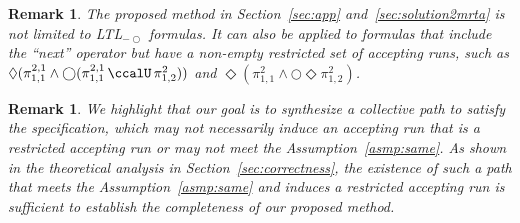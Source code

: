 \documentclass[Afour,sageh,times]{sagej}
\newtheorem{rem}[thm]{Remark}
\newcommand{\ltl}{ {\it LTL}$_{-\bigcirc}$ }
\renewcommand{\ap}[3]{\mathcal{\pi}_{{#1},{#2}}^{#3}}
\begin{document}
\begin{rem}
The proposed method in Section~\ref{sec:app} and~\ref{sec:solution2mrta} is not limited to  LTL$_{-\bigcirc}$ formulas. It can also be applied to  formulas that include the ``next'' operator but have a non-empty restricted set of accepting runs, such as $\Diamond(\ap{1}{1}{2,1} \wedge \bigcirc (\ap{1}{1}{2,1} \,\ccalU\, \ap{1}{2}{2}))$ and $\Diamond (\ap{1}{1}{2}  \wedge \bigcirc \Diamond \ap{1}{2}{2})$.
\end{rem}

\begin{rem}
We highlight that our goal is to synthesize a collective path to satisfy the specification, which may not necessarily induce an accepting run that is a restricted accepting run or may not meet the Assumption~\ref{asmp:same}. As shown in the theoretical analysis in Section~\ref{sec:correctness}, the existence of such a path that meets the Assumption~\ref{asmp:same} and induces a restricted accepting run is sufficient to establish the completeness of our proposed method.
\end{rem}


\end{document}
